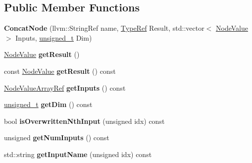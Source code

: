 \subsection*{Public Member Functions}
\begin{DoxyCompactItemize}
\item 
\mbox{\label{classglow_1_1_concat_node_a39cb34618b1ab7dadc83027c79bb37e5}} 
{\bfseries Concat\+Node} (llvm\+::\+String\+Ref name, \hyperlink{structglow_1_1_type}{Type\+Ref} Result, std\+::vector$<$ \hyperlink{structglow_1_1_node_value}{Node\+Value} $>$ Inputs, \hyperlink{namespaceglow_a0ca574644e1e42ef193a9947fb4d8911}{unsigned\+\_\+t} Dim)
\item 
\mbox{\label{classglow_1_1_concat_node_a176726b784cdc653cd46e039a6f926e6}} 
\hyperlink{structglow_1_1_node_value}{Node\+Value} {\bfseries get\+Result} ()
\item 
\mbox{\label{classglow_1_1_concat_node_a9bc9b77248642da12fc6fe5dd440b8dc}} 
const \hyperlink{structglow_1_1_node_value}{Node\+Value} {\bfseries get\+Result} () const
\item 
\mbox{\label{classglow_1_1_concat_node_a803b2eb3c74d9da2ba98223628ec5e10}} 
\hyperlink{classglow_1_1_node_value_array_ref}{Node\+Value\+Array\+Ref} {\bfseries get\+Inputs} () const
\item 
\mbox{\label{classglow_1_1_concat_node_a178a3c5521065d1461f13837c9a6a3b8}} 
\hyperlink{namespaceglow_a0ca574644e1e42ef193a9947fb4d8911}{unsigned\+\_\+t} {\bfseries get\+Dim} () const
\item 
\mbox{\label{classglow_1_1_concat_node_a83884b6972a44a772e5f2d862e1dd54e}} 
bool {\bfseries is\+Overwritten\+Nth\+Input} (unsigned idx) const
\item 
\mbox{\label{classglow_1_1_concat_node_a4e47c6ae9c47e1a5965a284b6e93926d}} 
unsigned {\bfseries get\+Num\+Inputs} () const
\item 
\mbox{\label{classglow_1_1_concat_node_a4c726e60b31fad9977f87256770358d8}} 
std\+::string {\bfseries get\+Input\+Name} (unsigned idx) const

\end{DoxyCompactItemize}
